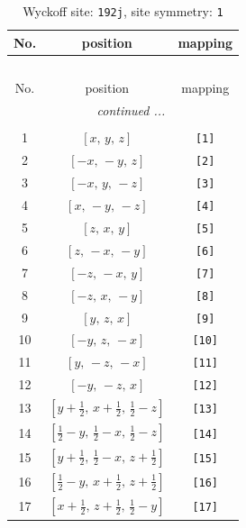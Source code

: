 \documentclass[fleqn,8pt]{jsarticle}
\begin{document}
\begin{longtable}{ccc}
\caption{Wyckoff site: {\tt 192j}, site symmetry: {\tt 1}}
 \\
 \hline \hline
No. & position & mapping \\ \hline \endfirsthead

\multicolumn{2}{l}{\tablename\ \thetable{}} \\
 \hline \hline
No. & position & mapping \\ \hline \endhead

 \hline \hline
\multicolumn{2}{r}{\footnotesize\it continued ...} \\ \endfoot

 \hline \hline
\multicolumn{2}{r}{} \\ \endlastfoot

1 & $\left[ x,\, y,\, z \right]$ & {\tt [1]} \\ \hline
2 & $\left[ - x,\, - y,\, z \right]$ & {\tt [2]} \\ \hline
3 & $\left[ - x,\, y,\, - z \right]$ & {\tt [3]} \\ \hline
4 & $\left[ x,\, - y,\, - z \right]$ & {\tt [4]} \\ \hline
5 & $\left[ z,\, x,\, y \right]$ & {\tt [5]} \\ \hline
6 & $\left[ z,\, - x,\, - y \right]$ & {\tt [6]} \\ \hline
7 & $\left[ - z,\, - x,\, y \right]$ & {\tt [7]} \\ \hline
8 & $\left[ - z,\, x,\, - y \right]$ & {\tt [8]} \\ \hline
9 & $\left[ y,\, z,\, x \right]$ & {\tt [9]} \\ \hline
10 & $\left[ - y,\, z,\, - x \right]$ & {\tt [10]} \\ \hline
11 & $\left[ y,\, - z,\, - x \right]$ & {\tt [11]} \\ \hline
12 & $\left[ - y,\, - z,\, x \right]$ & {\tt [12]} \\ \hline
13 & $\left[ y + \frac{1}{2},\, x + \frac{1}{2},\, \frac{1}{2} - z \right]$ & {\tt [13]} \\ \hline
14 & $\left[ \frac{1}{2} - y,\, \frac{1}{2} - x,\, \frac{1}{2} - z \right]$ & {\tt [14]} \\ \hline
15 & $\left[ y + \frac{1}{2},\, \frac{1}{2} - x,\, z + \frac{1}{2} \right]$ & {\tt [15]} \\ \hline
16 & $\left[ \frac{1}{2} - y,\, x + \frac{1}{2},\, z + \frac{1}{2} \right]$ & {\tt [16]} \\ \hline
17 & $\left[ x + \frac{1}{2},\, z + \frac{1}{2},\, \frac{1}{2} - y \right]$ & {\tt [17]} \\ \hline

\end{longtable}
\end{document}
